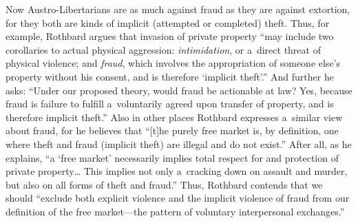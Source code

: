 {Now Austro-Libertarians are as much against fraud as they are against extortion, for they both are kinds of implicit (attempted or completed) theft. Thus, for example, Rothbard 
\parencite*[][p.77]{rothbard_ethics_1998} %
 argues that invasion of private property ``may include two corollaries to actual physical aggression: \textit{intimidation}, or a~direct threat of physical violence; and \textit{fraud}, which involves the appropriation of someone else's property without his consent, and is therefore ‘implicit theft'.'' And further he asks: ``Under our proposed theory, would fraud be actionable at law? Yes, because fraud is failure to fulfill a~voluntarily agreed upon transfer of property, and is therefore implicit theft.'' 
\parencite[][p.143]{rothbard_ethics_1998} %
 Also in other places Rothbard expresses a~similar view about fraud, for he 
\parencite*[][p.803]{} %
 believes that ``[t]he purely free market is, by definition, one where theft and fraud (implicit theft) are illegal and do not exist.'' After all, as he 
\parencite[][p.216]{rothbard_toward_2011} %
 explains, ``a ‘free market' necessarily implies total respect for and protection of private property… This implies not only a~cracking down on assault and murder, but also on all forms of theft and fraud.'' Thus, Rothbard 
\parencite*[][p.184]{rothbard_man_2009} %
 contends that we should ``exclude both explicit violence and the implicit violence of fraud from our definition of the free market---the pattern of voluntary interpersonal exchanges.''



}
